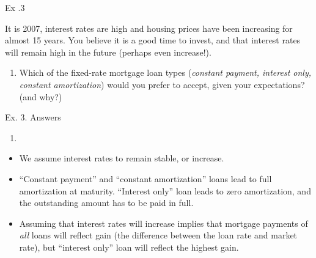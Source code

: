 \documentclass[ignorenonframetext,]{beamer}
\providecommand{\tightlist}{%
\setlength{\itemsep}{0pt}\setlength{\parskip}{0pt}}
\begin{document}
\begin{frame}{Ex .3}

It is 2007, interest rates are high and housing prices have been
increasing for almost 15 years. You believe it is a good time to invest,
and that interest rates will remain high in the future (perhaps even
increase!).

\begin{enumerate}
\def\labelenumi{\arabic{enumi}.}
\tightlist
\item
  Which of the fixed-rate mortgage loan types (\emph{constant payment,
  interest only, constant amortization}) would you prefer to accept,
  given your expectations? (and why?)
\end{enumerate}

\end{frame}

\begin{frame}{Ex. 3. Answers}

\begin{enumerate}
\def\labelenumi{\arabic{enumi}.}
\item
\end{enumerate}

\begin{itemize}
\tightlist
\item
  We assume interest rates to remain stable, or increase.
\item
  ``Constant payment'' and ``constant amortization'' loans lead to full
  amortization at maturity. ``Interest only'' loan leads to zero
  amortization, and the outstanding amount has to be paid in full.
\item
  Assuming that interest rates will increase implies that mortgage
  payments of \emph{all} loans will reflect gain (the difference between
  the loan rate and market rate), but ``interest only'' loan will
  reflect the highest gain.
\end{itemize}

\end{frame}
\end{document}
